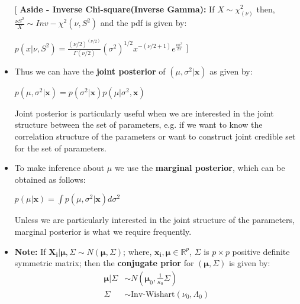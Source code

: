 \documentclass[12pt]{article}
\begin{document}
\begin{itemize}
\begin{align*}
\end{align*}
[ \textbf{Aside - Inverse Chi-square(Inverse Gamma): } If $X \sim \chi^2_{(\nu)}$ then, $\frac{\nu S^2}{X} \sim Inv - \chi^2(\nu, S^2)$ and the pdf is given by:
\begin{center}
$p(x | \nu, S^2) = \frac{(\nu/2)^{(\nu/2)}}{\Gamma(\nu/2)} (\sigma^2)^{1/2} x^{-(\nu/2 + 1)} e^{\frac{\nu \sigma^2} {2x} }$ ]
\end{center}
\item Thus we can have the \textbf{joint posterior} of $(\mu, \sigma^2 | \mathbf{x})$ as given by:
\begin{center}
$p(\mu, \sigma^2 | \mathbf{x}) = p(\sigma^2| \mathbf{x}) p(\mu|\sigma^2, \mathbf{x})$
\end{center}
Joint posterior is particularly useful when we are interested in the joint structure between the set of parameters, e.g. if we want to know the correlation structure of the parameters or want to construct joint credible set for the set of parameters. 

\item To make inference about $\mu$ we use the \textbf{marginal posterior}, which can be obtained as follows:
\begin{center}
$p(\mu | \mathbf{x}) = \int p(\mu, \sigma^2 | \mathbf{x}) d\sigma^2$
\end{center}
Unless we are particularly interested in the joint structure of the parameters, marginal posterior is what we require frequently.
\item \textbf{Note: } If $\mathbf{X_i} | \boldsymbol{\mu}, \Sigma \sim N(\boldsymbol{\mu}, \Sigma)$; where, $\mathbf{x_i}, \boldsymbol{\mu} \in \mathbb{R}^p$, $\Sigma$ is $p \times p$ positive definite symmetric matrix; then the \textbf{conjugate prior} for $(\boldsymbol{\mu}, \Sigma)$ is given by:
\begin{align*}
\boldsymbol{\mu}|\Sigma &\sim N(\boldsymbol{\mu}_0, \frac{1}{\kappa_0}\Sigma) \\
\Sigma  &\sim \text{Inv-Wishart}( \nu_0, \Lambda_0)
\end{align*}

\end{itemize}
\end{document}
